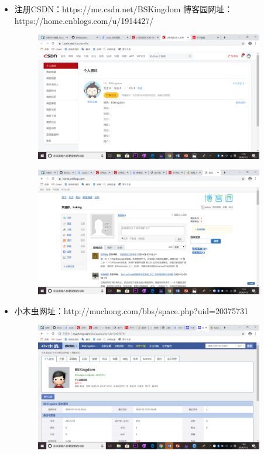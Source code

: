 \documentclass{article}
\begin{document}
\begin{itemize}
\begin{figure}[H]
\end{figure}
    \item 注册CSDN：https://me.csdn.net/BSKingdom 
    博客园网址：https://home.cnblogs.com/u/1914427/  \begin{figure}[H]
    	\centering
    	\includegraphics[width=10cm]{2020-01-03 (3).png}
    	\label{figupc}
    	
    \end{figure}
   \begin{figure}[H]
	\centering
	\includegraphics[width=10cm]{2020-01-03 (4).png}
	\label{figupc}
	
\end{figure}
\item
小木虫网址：http://muchong.com/bbs/space.php?uid=20375731

      \begin{figure}[H]
    	\centering
    	\includegraphics[width=10cm]{2020-01-03 (5).png}
    	\label{figupc}
    	
    \end{figure}
\end{itemize}


\hspace*{\fill} \\


\end{document}
